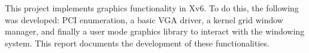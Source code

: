 This project implements graphics functionality in Xv6. To do this, the following was developed: PCI enumeration, a basic VGA driver, a kernel grid window manager, and finally a user mode graphics library to interact with the windowing system. This report documents the development of these functionalities.